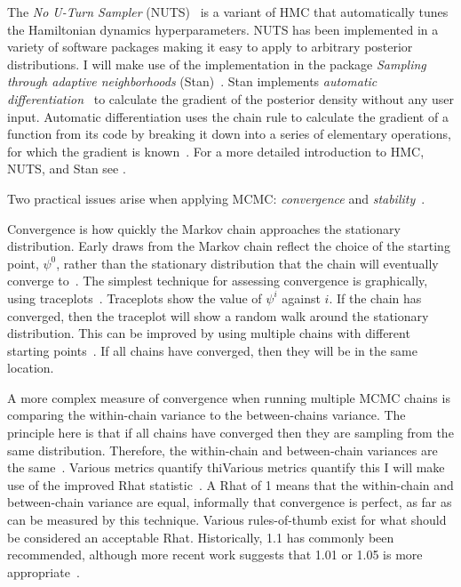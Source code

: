 \documentclass[thesis.tex]{subfiles}
\begin{document}
The \emph{No U-Turn Sampler} (NUTS)~\autocite{hoffmanNUTS} is a variant of HMC that automatically tunes the Hamiltonian dynamics hyperparameters.
NUTS has been implemented in a variety of software packages making it easy to apply to arbitrary posterior distributions.
I will make use of the implementation in the package \emph{Sampling through adaptive neighborhoods} (Stan)~\autocite{Stan-2-32-2}.
Stan implements \emph{automatic differentiation}~\autocite{griewankAutoDiff} to calculate the gradient of the posterior density without any user input.
Automatic differentiation uses the chain rule to calculate the gradient of a function from its code by breaking it down into a series of elementary operations, for which the gradient is known~\autocite{autodiff}.
For a more detailed introduction to HMC, NUTS, and Stan see \textcite[chapter 12]{gelmanBDA}.

Two practical issues arise when applying MCMC: \emph{convergence} and \emph{stability}~\autocite[72]{lunnBUGS}.

Convergence is how quickly the Markov chain approaches the stationary distribution.
Early draws from the Markov chain reflect the choice of the starting point, $\psi^0$, rather than the stationary distribution that the chain will eventually converge to~\autocite[282]{gelmanBDA}.
The simplest technique for assessing convergence is graphically, using traceplots~\autocite[81]{brooksMCMCNotes}.
Traceplots show the value of $\psi^i$ against $i$.
If the chain has converged, then the traceplot will show a random walk around the stationary distribution.
This can be improved by using multiple chains with different starting points~\autocite[283]{gelmanBDA}.
If all chains have converged, then they will be in the same location.

A more complex measure of convergence when running multiple MCMC chains is comparing the within-chain variance to the between-chains variance.
The principle here is that if all chains have converged then they are sampling from the same distribution.
Therefore, the within-chain and between-chain variances are the same~\autocite[82]{brooksMCMCNotes}.
Various metrics quantify thiVarious metrics quantify this I will make use of the improved Rhat statistic~\autocite{vehtariRhat}.
A Rhat of 1 means that the within-chain and between-chain variance are equal, informally that convergence is perfect, as far as can be measured by this technique.
Various rules-of-thumb exist for what should be considered an acceptable Rhat.
Historically, 1.1 has commonly been recommended, although more recent work suggests that 1.01 or 1.05 is more appropriate~\autocite{vehtariRhat}.
\end{document}
